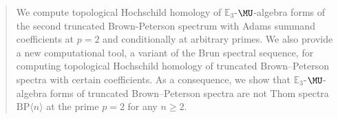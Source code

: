 \begin{abstract}
We compute topological Hochschild homology of $\mathbb{E}_3$-$\MU$-algebra forms of the second truncated Brown-Peterson spectrum with Adams summand coefficients at $p=2$ and conditionally at arbitrary primes.  
We also provide a new computational tool, a variant of the Brun spectral sequence, for computing topological Hochschild homology of truncated Brown--Peterson spectra with certain coefficients. As a consequence, we show that $\mathbb{E}_3$-$\MU$-algebra forms of truncated Brown--Peterson spectra are not Thom spectra $\mathrm{BP}\langle n\rangle$ at the prime $p=2$ for any $n\ge 2$. 
\end{abstract}
